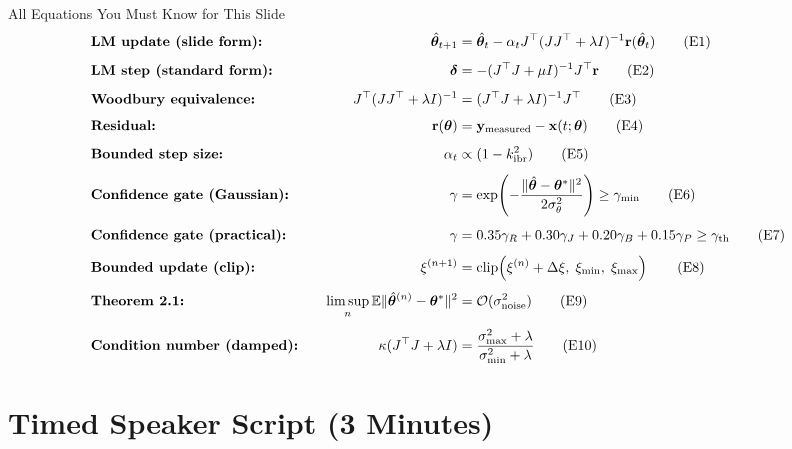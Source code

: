 \documentclass[12pt,a4paper]{article}
\newcommand{\kibr}{k_\mathrm{ibr}}
\newcommand{\thetahat}{\hat{\bm{\theta}}}
\newcommand{\thetastar}{\bm{\theta}^*}
\newcommand{\rvec}{\mathbf{r}}
\newcommand{\gammath}{\gamma_\mathrm{th}}
\newcommand{\gmin}{\gamma_\mathrm{min}}
\newcommand{\sigth}{\sigma_\theta}
\begin{document}
\begin{formulabox}{All Equations You Must Know for This Slide}
\begin{alignat}{2}
  &\text{\textbf{LM update (slide form):}} &\quad
  \thetahat_{t+1} &= \thetahat_t - \alpha_t J^\top(JJ^\top+\lambda I)^{-1}\rvec(\thetahat_t)
  \tag{E1}\label{E1}\\[4pt]
  &\text{\textbf{LM step (standard form):}} &\quad
  \bm{\delta} &= -(J^\top J + \mu I)^{-1}J^\top\rvec
  \tag{E2}\label{E2}\\[4pt]
  &\text{\textbf{Woodbury equivalence:}} &\quad
  J^\top(JJ^\top+\lambda I)^{-1} &= (J^\top J+\lambda I)^{-1}J^\top
  \tag{E3}\label{E3}\\[4pt]
  &\text{\textbf{Residual:}} &\quad
  \rvec(\bm{\theta}) &= \mathbf{y}_\mathrm{measured} - \mathbf{x}(t;\bm{\theta})
  \tag{E4}\label{E4}\\[4pt]
  &\text{\textbf{Bounded step size:}} &\quad
  \alpha_t &\propto (1-\kibr^2)
  \tag{E5}\label{E5}\\[4pt]
  &\text{\textbf{Confidence gate (Gaussian):}} &\quad
  \gamma &= \exp\!\left(-\frac{\|\thetahat-\thetastar\|^2}{2\sigth^2}\right) \geq \gmin
  \tag{E6}\label{E6}\\[4pt]
  &\text{\textbf{Confidence gate (practical):}} &\quad
  \gamma &= 0.35\gamma_R + 0.30\gamma_J + 0.20\gamma_B + 0.15\gamma_P \geq \gammath
  \tag{E7}\label{E7}\\[4pt]
  &\text{\textbf{Bounded update (clip):}} &\quad
  \xi^{(n+1)} &= \mathrm{clip}\!\left(\xi^{(n)}+\Delta\xi,\;\xi_\mathrm{min},\;\xi_\mathrm{max}\right)
  \tag{E8}\label{E8}\\[4pt]
  &\text{\textbf{Theorem 2.1:}} &\quad
  \limsup_{n}\mathbb{E}\|\thetahat^{(n)}-\thetastar\|^2 &= \mathcal{O}(\sigma_\mathrm{noise}^2)
  \tag{E9}\label{E9}\\[4pt]
  &\text{\textbf{Condition number (damped):}} &\quad
  \kappa(J^\top J+\lambda I) &= \frac{\sigma_\mathrm{max}^2+\lambda}{\sigma_\mathrm{min}^2+\lambda}
  \tag{E10}\label{E10}
\end{alignat}
\end{formulabox}

\section{Timed Speaker Script (3 Minutes)}
\end{document}

